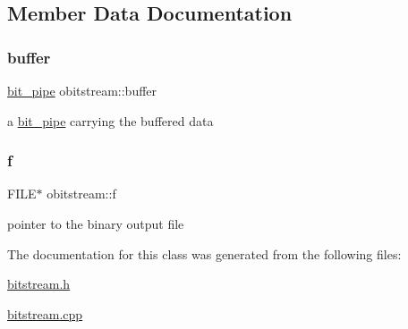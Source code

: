 \subsection{Member Data Documentation}
\mbox{\label{classobitstream_aeaccad00a395a404aa16472bfa052be3}} 
\subsubsection{\texorpdfstring{buffer}{buffer}}
{\footnotesize\ttfamily \hyperlink{classbit__pipe}{bit\+\_\+pipe} obitstream\+::buffer\hspace{0.3cm}{\ttfamily [private]}}



a \hyperlink{classbit__pipe}{bit\+\_\+pipe} carrying the buffered data 

\mbox{\label{classobitstream_ac589d74745217748c888ae777ab324a7}} 
\subsubsection{\texorpdfstring{f}{f}}
{\footnotesize\ttfamily F\+I\+LE$\ast$ obitstream\+::f\hspace{0.3cm}{\ttfamily [private]}}

pointer to the binary output file 

The documentation for this class was generated from the following files\+:\begin{DoxyCompactItemize}
\item 
\hyperlink{bitstream_8h}{bitstream.\+h}\item 
\hyperlink{bitstream_8cpp}{bitstream.\+cpp}\end{DoxyCompactItemize}
